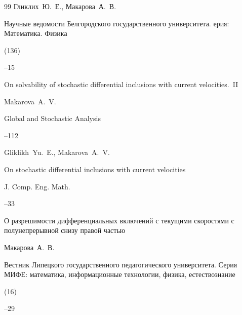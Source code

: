 \begin{thebibliography}{99}
\by Гликлих~Ю.~Е., Макарова~А.~В.

\jour Научные ведомости Белгородского государственного университета. ерия: Математика. Физика



(136)

--15







\paper On solvability of stochastic differential inclusions with current velocities.~II 

\by Makarova~A.~V. 

\jour Global and Stochastic Analysis 




--112




\by Gliklikh~Yu.~E., Makarova~A.~V.

\paper On stochastic differential inclusions with current velocities

\jour J. Comp. Eng. Math.




--33







\paper О разрешимости дифференциальных включений с текущими скоростями с полунепрерывной снизу правой частью

\by Макарова~А.~В.

\jour Вестник Липецкого государственного педагогического университета. Серия МИФЕ: математика, информационные технологии, физика, естествознание


(16)

--29


\end{thebibliography}
